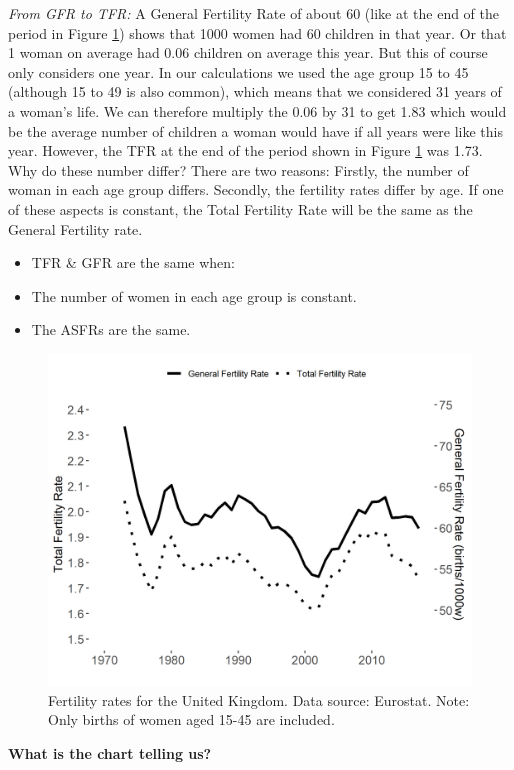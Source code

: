 \documentclass[]{book}
\providecommand{\tightlist}{%
  \setlength{\itemsep}{0pt}\setlength{\parskip}{0pt}}
\begin{document}
\emph{From GFR to TFR:} A General Fertility Rate of about 60 (like at the end of the period in Figure \ref{fig:death1}) shows that 1000 women had 60 children in that year. Or that 1 woman on average had 0.06 children on average this year. But this of course only considers one year. In our calculations we used the age group 15 to 45 (although 15 to 49 is also common), which means that we considered 31 years of a woman's life. We can therefore multiply the 0.06 by 31 to get 1.83 which would be the average number of children a woman would have if all years were like this year. However, the TFR at the end of the period shown in Figure \ref{fig:death1} was 1.73. Why do these number differ? There are two reasons: Firstly, the number of woman in each age group differs. Secondly, the fertility rates differ by age. If one of these aspects is constant, the Total Fertility Rate will be the same as the General Fertility rate.

\begin{itemize}
\tightlist
\item
  TFR \& GFR are the same when:
\item
  The number of women in each age group is constant.
\item
  The ASFRs are the same.
\end{itemize}

\begin{figure}

{\centering \includegraphics[width=0.7\linewidth]{_resources/chapter_death/fig10} 

}

\caption{Fertility rates for the United Kingdom. Data source: Eurostat. Note: Only births of women aged 15-45 are included.}\label{fig:death1}
\end{figure}

\textbf{What is the chart telling us?}
\end{document}
